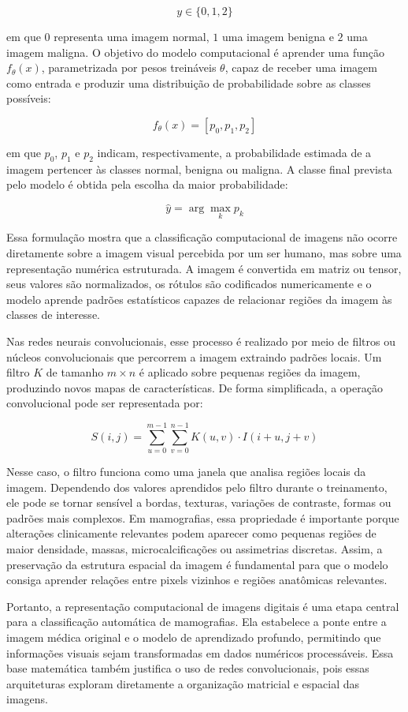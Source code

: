 \documentclass[
    12pt,
    openright,
    oneside,
    a4paper,
    english,
    brazil
]{abntex2}
\begin{document}
\[
y \in \{0, 1, 2\}
\]

em que \(0\) representa uma imagem normal, \(1\) uma imagem benigna e \(2\) uma imagem maligna. O objetivo do modelo computacional é aprender uma função \(f_{\theta}(x)\), parametrizada por pesos treináveis \(\theta\), capaz de receber uma imagem como entrada e produzir uma distribuição de probabilidade sobre as classes possíveis:

\[
f_{\theta}(x) = [p_0, p_1, p_2]
\]

em que \(p_0\), \(p_1\) e \(p_2\) indicam, respectivamente, a probabilidade estimada de a imagem pertencer às classes normal, benigna ou maligna. A classe final prevista pelo modelo é obtida pela escolha da maior probabilidade:

\[
\hat{y} = \arg\max_{k} p_k
\]

Essa formulação mostra que a classificação computacional de imagens não ocorre diretamente sobre a imagem visual percebida por um ser humano, mas sobre uma representação numérica estruturada. A imagem é convertida em matriz ou tensor, seus valores são normalizados, os rótulos são codificados numericamente e o modelo aprende padrões estatísticos capazes de relacionar regiões da imagem às classes de interesse.

Nas redes neurais convolucionais, esse processo é realizado por meio de filtros ou núcleos convolucionais que percorrem a imagem extraindo padrões locais. Um filtro \(K\) de tamanho \(m \times n\) é aplicado sobre pequenas regiões da imagem, produzindo novos mapas de características. De forma simplificada, a operação convolucional pode ser representada por:

\[
S(i,j) = \sum_{u=0}^{m-1}\sum_{v=0}^{n-1} K(u,v) \cdot I(i+u,j+v)
\]

Nesse caso, o filtro funciona como uma janela que analisa regiões locais da imagem. Dependendo dos valores aprendidos pelo filtro durante o treinamento, ele pode se tornar sensível a bordas, texturas, variações de contraste, formas ou padrões mais complexos. Em mamografias, essa propriedade é importante porque alterações clinicamente relevantes podem aparecer como pequenas regiões de maior densidade, massas, microcalcificações ou assimetrias discretas. Assim, a preservação da estrutura espacial da imagem é fundamental para que o modelo consiga aprender relações entre pixels vizinhos e regiões anatômicas relevantes.

Portanto, a representação computacional de imagens digitais é uma etapa central para a classificação automática de mamografias. Ela estabelece a ponte entre a imagem médica original e o modelo de aprendizado profundo, permitindo que informações visuais sejam transformadas em dados numéricos processáveis. Essa base matemática também justifica o uso de redes convolucionais, pois essas arquiteturas exploram diretamente a organização matricial e espacial das imagens.
\end{document}
